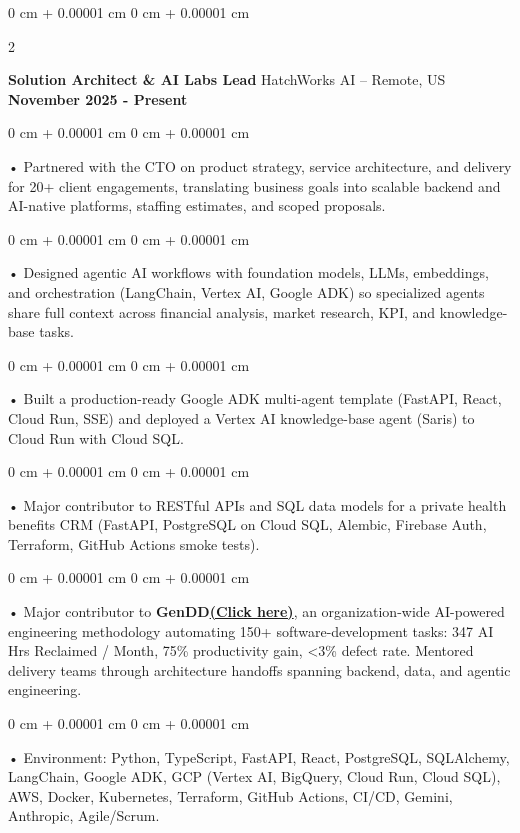 \documentclass[10pt, letterpaper]{article}
\newenvironment{onecolentry}{
    \begin{adjustwidth}{
        0 cm + 0.00001 cm
    }{
        0 cm + 0.00001 cm
    }
}{
    \end{adjustwidth}
} %
\newenvironment{twocolentry}[2][]{
    \onecolentry
    \def\secondColumn{#2}
    \setcolumnwidth{\fill, 4.5 cm}
    \begin{paracol}{2}
}{
    \switchcolumn \raggedleft \secondColumn
    \end{paracol}
    \endonecolentry
} %
\begin{document}
        \begin{twocolentry}{
            \textbf{November 2025 - Present}
        }
            \textbf{Solution Architect \& AI Labs Lead} HatchWorks AI -- Remote, US\end{twocolentry}

        \begin{onecolentry}
             • Partnered with the CTO on product strategy, service architecture, and delivery for 20+ client engagements, translating business goals into scalable backend and AI-native platforms, staffing estimates, and scoped proposals.
        \end{onecolentry}
        \begin{onecolentry}
             • Designed agentic AI workflows with foundation models, LLMs, embeddings, and orchestration (LangChain, Vertex AI, Google ADK) so specialized agents share full context across financial analysis, market research, KPI, and knowledge-base tasks.
        \end{onecolentry}
        \begin{onecolentry}
             • Built a production-ready Google ADK multi-agent template (FastAPI, React, Cloud Run, SSE) and deployed a Vertex AI knowledge-base agent (Saris) to Cloud Run with Cloud SQL.
        \end{onecolentry}
        \begin{onecolentry}
             • Major contributor to RESTful APIs and SQL data models for a private health benefits CRM (FastAPI, PostgreSQL on Cloud SQL, Alembic, Firebase Auth, Terraform, GitHub Actions smoke tests).
        \end{onecolentry}
        \begin{onecolentry}
             • Major contributor to \textbf{GenDD}\href{https://hatchworks.com/generative-driven-development/}{\textbf{(Click here)}}, an organization-wide AI-powered engineering methodology automating 150+ software-development tasks: 347 AI Hrs Reclaimed / Month, 75\% productivity gain, \textless3\% defect rate. Mentored delivery teams through architecture handoffs spanning backend, data, and agentic engineering.
        \end{onecolentry}
        \begin{onecolentry}
             • Environment: Python, TypeScript, FastAPI, React, PostgreSQL, SQLAlchemy, LangChain, Google ADK, GCP (Vertex AI, BigQuery, Cloud Run, Cloud SQL), AWS, Docker, Kubernetes, Terraform, GitHub Actions, CI/CD, Gemini, Anthropic, Agile/Scrum.
        \end{onecolentry}
\end{document}
